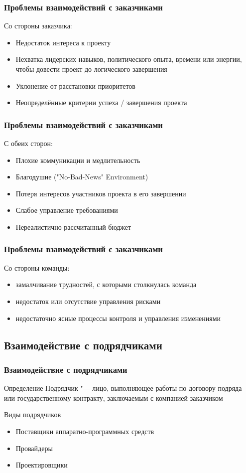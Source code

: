 \documentclass{../industrial-development}
\begin{document}
\begin{frame} \frametitle{Проблемы взаимодействий с заказчиками}
	Со стороны заказчика:
	\begin{itemize}
		\item Недостаток интереса к проекту
		\item Нехватка лидерских навыков, политического опыта, времени или энергии, чтобы довести проект до логического завершения
		\item Уклонение от расстановки приоритетов
		\item Неопределённые критерии успеха / завершения проекта
	\end{itemize}
\end{frame}

\begin{frame} \frametitle{Проблемы взаимодействий с заказчиками}
	С обеих сторон:
	\begin{itemize}
		\item Плохие коммуникации и медлительность
		\item Благодушие ("No-Bad-News" Environment)
		\item Потеря интересов участников проекта в его завершении
		\item Слабое управление требованиями
		\item Нереалистично рассчитанный бюджет
	\end{itemize}
\end{frame}

\begin{frame} \frametitle{Проблемы взаимодействий с заказчиками}
	Со стороны команды:
	\begin{itemize}
		\item замалчивание трудностей, с которыми столкнулась команда
		\item недостаток или отсутствие управления рисками
		\item недостаточно ясные процессы контроля и управления изменениями
	\end{itemize}
\end{frame}

\subsection{Взаимодействие с подрядчиками}
\begin{frame} \frametitle{Взаимодействие с подрядчиками}
	\begin{block}{Определение}
		\alert{Подрядчик} "--- лицо, выполняющее работы по договору подряда или государственному контракту, заключаемым с компанией-заказчиком
	\end{block}

	\begin{block}{Виды подрядчиков}
		\begin{itemize}
			\item Поставщики аппаратно-программных средств
			\item Провайдеры
			\item Проектировщики
		\end{itemize}
	\end{block}
\end{frame}
\end{document}
